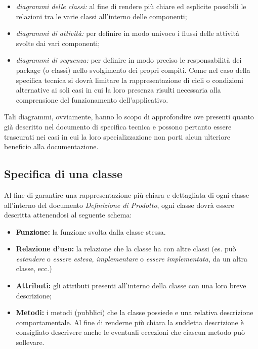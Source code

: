 {\begin{itemize}
\item \textit{diagrammi delle classi:} al fine di rendere più chiare ed esplicite possibili le relazioni tra le varie classi all'interno delle componenti;
\item \textit{diagrammi di attività:} per definire in modo univoco i flussi delle attività svolte dai vari componenti;
\item \textit{diagrammi di sequenza:} per definire in modo preciso le responsabilità dei package (o classi) nello svolgimento dei propri compiti. Come nel caso della specifica tecnica si dovrà limitare la rappresentazione di cicli o condizioni alternative ai soli casi in cui la loro presenza risulti necessaria alla comprensione del funzionamento dell'applicativo.
\end{itemize}

Tali diagrammi, ovviamente, hanno lo scopo di approfondire ove presenti quanto già descritto nel documento di specifica tecnica e possono pertanto essere trascurati nei casi in cui la loro specializzazione non porti alcun ulteriore beneficio alla documentazione.

\subsection{Specifica di una classe}
Al fine di garantire una rappresentazione più chiara e dettagliata di ogni classe all'interno del documento \textit{Definizione di Prodotto}, ogni classe dovrà essere descritta attenendosi al seguente schema:

\begin{itemize} 
\item \textbf{Funzione:} la funzione svolta dalla classe stessa.
\item \textbf{Relazione d'uso:} la relazione che la classe ha con altre classi (es. può \textit{estendere} o \textit{essere estesa}, \textit{implementare} o \textit{essere implementata}, da un altra classe, ecc.)
\item \textbf{Attributi:} gli attributi presenti all'interno della classe con una loro breve descrizione;
\item \textbf{Metodi:} i metodi (pubblici) che la classe possiede e una relativa descrizione comportamentale. Al fine di renderne più chiara la suddetta descrizione è consigliato descrivere anche le eventuali eccezioni che ciascun metodo può sollevare.
\end{itemize}

}
